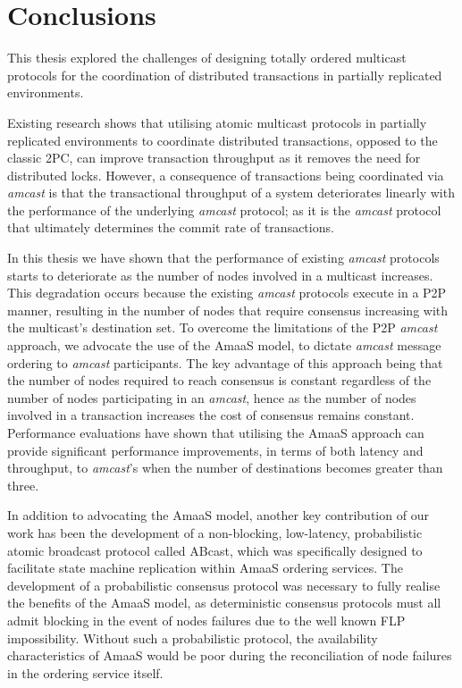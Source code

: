 \chapter{Conclusions}

    \graphicspath{{Chapter7-Conclusions/Figs/Vector/}{Chapter3-Conclusions/Figs/}}

This thesis explored the challenges of designing totally ordered multicast protocols for the coordination of distributed transactions in partially replicated environments.  

Existing research \citep{Ruivo:2011:ETO:2120967.2121604} shows that utilising atomic multicast protocols in partially replicated environments to coordinate distributed transactions, opposed to the classic 2PC, can improve transaction throughput as it removes the need for distributed locks.  However, a consequence of transactions being coordinated via \emph{amcast} is that the transactional throughput of a system deteriorates linearly with the performance of the underlying \emph{amcast} protocol; as it is the \emph{amcast} protocol that ultimately determines the commit rate of transactions.  

In this thesis we have shown that the performance of existing \emph{amcast} protocols starts to deteriorate as the number of nodes involved in a multicast increases.  This degradation occurs because the existing \emph{amcast} protocols execute in a P2P manner, resulting in the number of nodes that require consensus increasing with the multicast's destination set.  To overcome the limitations of the P2P \emph{amcast} approach, we advocate the use of the \textsf{AmaaS} model, to  dictate \emph{amcast} message ordering to \emph{amcast} participants. The key advantage of this approach being that the number of nodes required to reach consensus is constant regardless of the number of nodes participating in an \emph{amcast}, hence as the number of nodes involved in a transaction increases the cost of consensus remains constant.  Performance evaluations have shown that utilising the \textsf{AmaaS} approach can provide significant performance improvements, in terms of both latency and throughput, to \emph{amcast}'s when the number of destinations becomes greater than three. 

In addition to advocating the \textsf{AmaaS} model, another key contribution of our work has been the development of a non-blocking, low-latency, probabilistic atomic broadcast protocol called \textsf{ABcast}, which was specifically designed to facilitate state machine replication within \textsf{AmaaS} ordering services.  The development of a probabilistic consensus protocol was necessary to fully realise the benefits of the \textsf{AmaaS} model, as deterministic consensus protocols must all admit blocking in the event of nodes failures due to the well known FLP impossibility.  Without such a probabilistic protocol, the availability characteristics of \textsf{AmaaS} would be poor during the reconciliation of node failures in the ordering service itself.  

